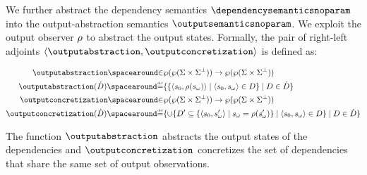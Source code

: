 We further abstract the dependency semantics $\dependencysemanticsnoparam$ into the output-abstraction semantics $\outputsemanticsnoparam$.
We exploit the output observer $\rho$ to abstract the output states.
Formally, the pair of right-left adjoints $\tuple{\outputabstraction}{\outputconcretization}$ is defined as:
%
\begin{definition}
\begin{align*}
  \outputabstraction \IN& \dependencytype \to \outputtype \\
  \outputabstraction(\defsetofsetofdependencies) \DefeQ& \setdef{
    \setdef{
      \tuple{\retrieveinput{\defstate}}{\outputobs(\retrieveoutput{\defstate})}
    }{
      \inputoutputtuple{\defstate}\in\defsetofdependencies
    }
  }{
    \defsetofdependencies \in \defsetofsetofdependencies
  }\\
  \outputconcretization \IN& \outputtype \to \dependencytype \\
  \outputconcretization(\defsetofsetofdependencies) \DefeQ& \setdef{
    \setjoin \setdef{
      \defsetofdependencies' \subseteq
      \setdef{
        \tuple{\retrieveinput\defstate}{\retrieveoutput\defstate'}
      }{
        \retrieveoutput{\defstate} = \outputobs(\retrieveoutput{\defstate'})
      }
    }{
      \inputoutputtuple{\defstate} \in \defsetofdependencies
    }
  }{
    \defsetofdependencies\in\defsetofsetofdependencies
  }
\end{align*}
\end{definition}
The function $\outputabstraction$ abstracts the output states of the dependencies and $\outputconcretization$ concretizes the set of dependencies that share the same set of output observations.

